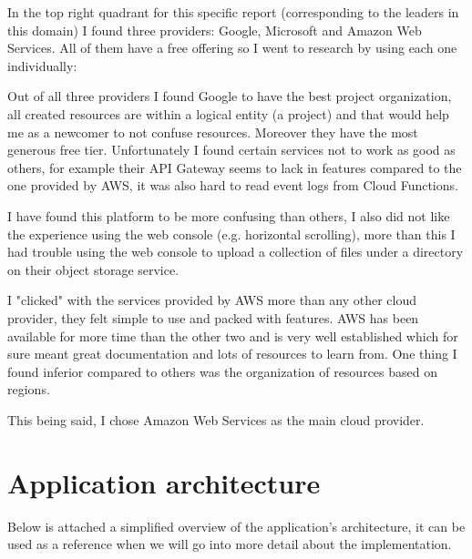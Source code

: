 In the top right quadrant for this specific report (corresponding to the leaders in this domain) I found three providers: Google, Microsoft and Amazon Web Services. All of them have a free offering so I went to research by using each one individually:

\begin{description}[style=unboxed, labelwidth=\linewidth]
	\item[Google Cloud Platform]
	Out of all three providers I found Google to have the best project organization, all created resources are within a logical entity (a project) and that would help me as a newcomer to not confuse resources. Moreover they have the most generous free tier. Unfortunately I found certain services not to work as good as others, for example their API Gateway seems to lack in features compared to the one provided by AWS, it was also hard to read event logs from Cloud Functions.
    \item[Microsoft Azure]
	I have found this platform to be more confusing than others, I also did not like the experience using the web console (e.g. horizontal scrolling), more than this I had trouble using the web console to upload a collection of files under a directory on their object storage service.
	\item[Amazon Web Services (AWS)]
	I "clicked" with the services provided by AWS more than any other cloud provider, they felt simple to use and packed with features. AWS has been available for more time than the other two and is very well established which for sure meant great documentation and lots of resources to learn from. One thing I found inferior compared to others was the organization of resources based on regions.
\end{description}

This being said, I chose Amazon Web Services as the main cloud provider.

\section{Application architecture}

Below is attached a simplified overview of the application's architecture, it can be used as a reference when we will go into more detail about the implementation.

